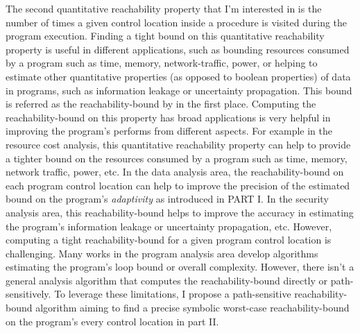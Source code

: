 

The second quantitative reachability property that I'm interested in is 
the number of times a given control location 
 inside a procedure is visited during the program execution.
Finding a tight bound on this quantitative reachability property is
useful in different applications, such as
bounding 
resources consumed by a program such as time, memory,
network-traffic, power, 
or helping to estimate other quantitative properties (as opposed to boolean properties)
of data in programs, such as information leakage or uncertainty propagation.
This bound is referred as the reachability-bound by \cite{GulwaniZ10} in the first place.
Computing the
reachability-bound on this property
has broad
applications is very helpful in improving the program's performs from different aspects.
For example in the resource cost analysis, this quantitative reachability property
can help to provide a tighter
bound on the resources consumed by a program such as time, memory,
network traffic, power, etc.
In the data analysis area,
the reachability-bound on each program control location
can help to improve the precision of the estimated bound on the program's \emph{adaptivity} as introduced in PART I.
In the security analysis area, this reachability-bound helps to improve the accuracy
in estimating the program's information leakage or uncertainty propagation, etc.
However, computing a tight reachability-bound for a given program control location is challenging.
Many works in the program analysis area develop algorithms estimating the program's loop bound or overall complexity.
However, there isn't a general analysis algorithm that
computes the reachability-bound
directly or path-sensitively.
To leverage these limitations,
I propose a path-sensitive reachability-bound algorithm
aiming to find a precise symbolic worst-case reachability-bound on the program's every control location
in part II.


